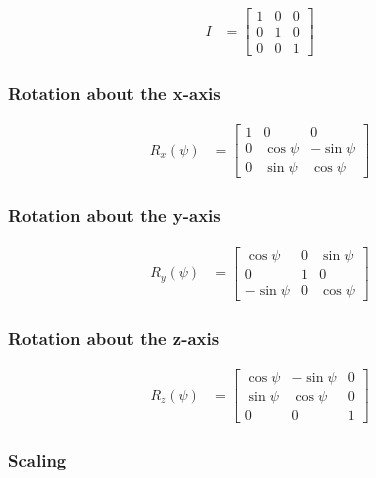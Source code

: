 \documentclass[twoside]{article}
\begin{document}
\begin{align*}
  I & = \left[ \begin{array}{rrr}
    1 & 0 & 0 \\
    0 & 1 & 0 \\
    0 & 0 & 1
    \end{array} \right]
  \end{align*}

\subsubsection{Rotation about the x-axis}

\begin{align*}
  R_x( \psi ) & = \left[ \begin{array}{rrr}
    1 & 0 & 0 \\
    0 & \cos \psi & -\sin \psi \\
    0 & \sin \psi &  \cos \psi 
    \end{array} \right]
  \end{align*}

\subsubsection{Rotation about the y-axis}

\begin{align*}
  R_y( \psi ) & = \left[ \begin{array}{rrr}
    \cos \psi & 0 & \sin \psi \\
    0 & 1 & 0 \\
    -\sin \psi & 0 & \cos \psi
    \end{array} \right]    
  \end{align*}


\subsubsection{Rotation about the z-axis}

\begin{align*}
  R_z( \psi ) & = \left[ \begin{array}{rrr}
    \cos \psi & -\sin \psi & 0 \\
    \sin \psi &  \cos \psi & 0 \\
    0 & 0 & 1
    \end{array} \right]
  \end{align*}

\subsubsection{Scaling}
\end{document}

